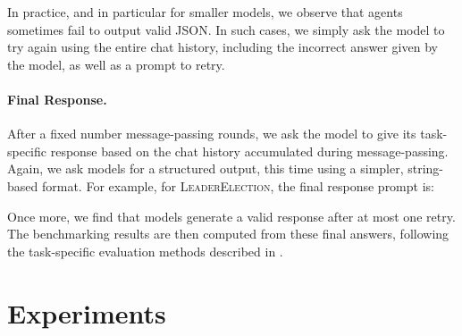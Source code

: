 \documentclass{article}
\newlength{\chatlogwidth}
\newenvironment{chatlog}{
  \noindent
  \begin{minipage}{\chatlogwidth}
  \begin{mdframed}[
    backgroundcolor=chatbg,
    leftline=true,
    rightline=false,
    topline=false,
    bottomline=false,
    linecolor=chatsideline,
    linewidth=3pt,
    innerleftmargin=15pt,
    innerrightmargin=20pt,
    innertopmargin=10pt,
    innerbottommargin=5pt
  ]
}{
  \vspace{-0.2em}
  \end{mdframed}
  \end{minipage}
}
\begin{document}
In practice, and in particular for smaller models, we observe that agents sometimes fail to output valid JSON. In such cases, we simply ask the model to try again using the entire chat history, including the incorrect answer given by the model, as well as a prompt to retry.

\paragraph{Final Response.}
After a fixed number message-passing rounds, we ask the model to give its task-specific response based on the chat history accumulated during message-passing. Again, we ask models for a structured output, this time using a simpler, string-based format. For example, for \textsc{LeaderElection}, the final response prompt is:

\vspace{2px}
\begin{chatlog}
\end{chatlog}

Once more, we find that models generate a valid response after at most one retry.
The benchmarking results are then computed from these final answers, following the task-specific evaluation methods described in .





\section{Experiments}\label{sec:experiments}
\end{document}
